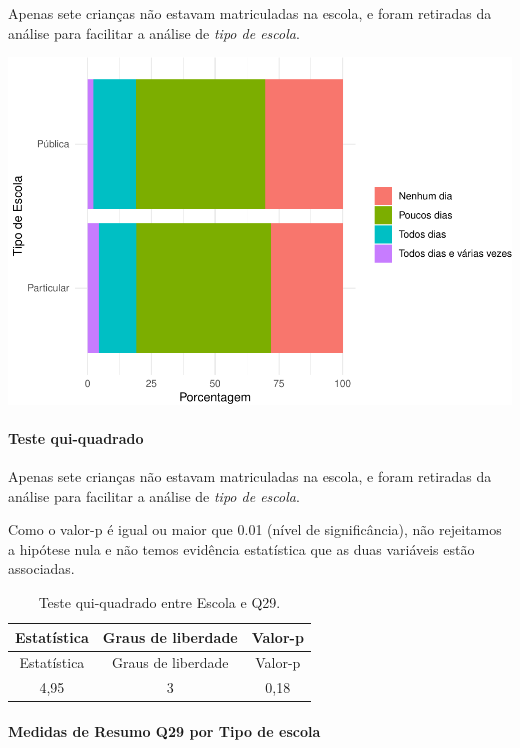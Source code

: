 \documentclass[]{article}
\let\oldparagraph\paragraph
\renewcommand{\paragraph}[1]{\oldparagraph{#1}\mbox{}}
\begin{document}
Apenas sete crianças não estavam matriculadas na escola, e foram retiradas da análise para facilitar a análise de \emph{tipo de escola}.

\begin{center}\includegraphics[width=0.75\linewidth]{relatorio_covid19_files/figure-latex/unnamed-chunk-938-1} \end{center}

\hypertarget{teste-qui-quadrado-81}{%
\paragraph{Teste qui-quadrado}\label{teste-qui-quadrado-81}}

Apenas sete crianças não estavam matriculadas na escola, e foram retiradas da análise para facilitar a análise de \emph{tipo de escola}.

Como o valor-p é igual ou maior que 0.01 (nível de significância), não rejeitamos a hipótese nula e não temos evidência estatística que as duas variáveis estão associadas.

\begin{longtable}[]{@{}ccc@{}}
\caption{\label{tab:unnamed-chunk-940}Teste qui-quadrado entre Escola e Q29.}\tabularnewline
\toprule
Estatística & Graus de liberdade & Valor-p\tabularnewline
\midrule
\endfirsthead
\toprule
Estatística & Graus de liberdade & Valor-p\tabularnewline
\midrule
\endhead
4,95 & 3 & 0,18\tabularnewline
\bottomrule
\end{longtable}

\cleardoublepage

\hypertarget{medidas-de-resumo-q29-por-tipo-de-escola}{%
\paragraph{Medidas de Resumo Q29 por Tipo de escola}\label{medidas-de-resumo-q29-por-tipo-de-escola}}
\end{document}
